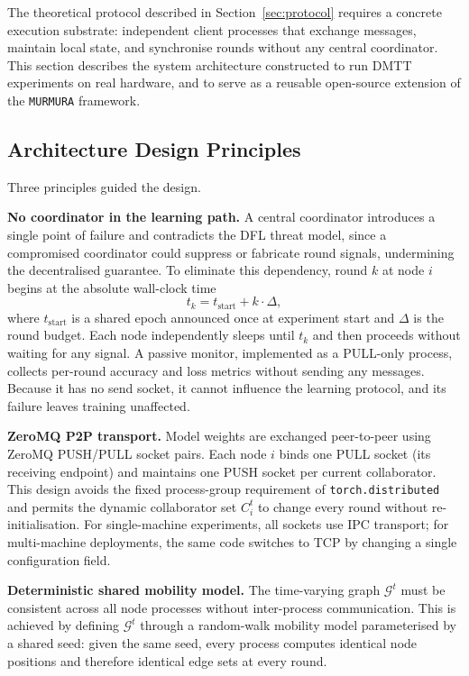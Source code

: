 \documentclass[journal]{IEEEtran}
\newenvironment{added}{\begingroup\color{addedcolor}}{\endgroup}
\theoremstyle{definition}
\theoremstyle{remark}
\begin{document}
\begin{added}
The theoretical protocol described in Section~\ref{sec:protocol} requires a concrete execution substrate: independent client processes that exchange messages, maintain local state, and synchronise rounds without any central coordinator.
This section describes the system architecture constructed to run DMTT experiments on real hardware, and to serve as a reusable open-source extension of the \texttt{MURMURA} framework.

\subsection{Architecture Design Principles}

Three principles guided the design.

\textbf{No coordinator in the learning path.}
A central coordinator introduces a single point of failure and contradicts the DFL threat model, since a compromised coordinator could suppress or fabricate round signals, undermining the decentralised guarantee.
To eliminate this dependency, round $k$ at node $i$ begins at the absolute wall-clock time
\begin{equation}
  t_k = t_{\mathrm{start}} + k \cdot \Delta,
  \label{eq:wall_clock}
\end{equation}
where $t_{\mathrm{start}}$ is a shared epoch announced once at experiment start and $\Delta$ is the round budget.
Each node independently sleeps until $t_k$ and then proceeds without waiting for any signal.
A passive monitor, implemented as a PULL-only process, collects per-round accuracy and loss metrics without sending any messages.
Because it has no send socket, it cannot influence the learning protocol, and its failure leaves training unaffected.

\textbf{ZeroMQ P2P transport.}
Model weights are exchanged peer-to-peer using ZeroMQ PUSH/PULL socket pairs.
Each node $i$ binds one PULL socket (its receiving endpoint) and maintains one PUSH socket per current collaborator.
This design avoids the fixed process-group requirement of \texttt{torch.distributed} and permits the dynamic collaborator set $C_i^t$ to change every round without re-initialisation.
For single-machine experiments, all sockets use IPC transport; for multi-machine deployments, the same code switches to TCP by changing a single configuration field.

\textbf{Deterministic shared mobility model.}
The time-varying graph $\mathcal{G}^t$ must be consistent across all node processes without inter-process communication.
This is achieved by defining $\mathcal{G}^t$ through a random-walk mobility model parameterised by a shared seed: given the same seed, every process computes identical node positions and therefore identical edge sets at every round.
\end{added}
\end{document}
